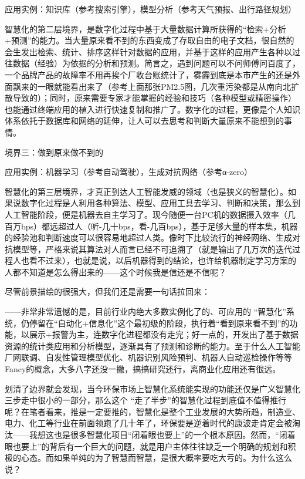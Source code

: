 \documentclass[
]{book}
\begin{document}
应用实例：知识库（参考搜索引擎），模型分析（参考天气预报、出行路径规划）

智慧化的第二层境界，是数字化过程中基于大量数据计算所获得的``检索+分析+预测''的能力。当大量原来看不到的东西变成了存取自由的电子文档，很自然的会生发出检索、统计、排序这样针对数据的应用，并基于这样的应用产生各种以过往数据（经验）为依据的分析和预测。简言之，遇到问题可以不问师傅问百度了，一个品牌产品的故障率不用再挨个厂收台账统计了，雾霾到底是本市产生的还是外面飘来的一眼就能看出来了（参考上面那张PM2.5图，几次重污染都是从南向北扩散导致的）；同时，原来需要专家才能掌握的经验和技巧（各种模型或精密操作）也能通过终端应用的植入进行快速复制和推广了。数字化的过程，更像是个人知识体系依托于数据库和网络的延伸，让人可以去思考和判断大量原来不能想到的事情。

境界三：做到原来做不到的

应用实例：机器学习（参考自动驾驶），生成对抗网络（参考α-zero）

智慧化的第三层境界，才真正到达人工智能发威的领域（也是狭义的智慧化）。如果说数字化过程是人利用各种算法、模型、应用工具去学习、判断和决策，那么到人工智能阶段，便是机器去自主学习了。现今随便一台PC机的数据摄入效率（几百万bps）都远超过人（听-几十bps，看-几百bps），基于足够大量的样本集，机器的经验池和判断速度可以很容易地超过人类。像时下比较流行的神经网络、生成对抗模型等，严格来说其算法对人而言已经不可追溯了（就是输出了几万次的迭代过程人也看不过来），也就是说，以后机器得到的结论，也许给机器制定学习方案的人都不知道是怎么得出来的------这个时候我是信还是不信呢？

尽管前景描绘的很强大，但我们还是需要一句话拉回来：

------非常非常遗憾的是，目前行业内绝大多数实例化了的、可应用的 ``智慧化''系统，仍停留在``自动化+信息化''这个最初级的阶段，执行着``看到原来看不到''的功能，以展示+报警为主，连数字化进程都没有走完；好一点的，开发出了基于数据资源的统计类应用和分析模型，逐渐具有了预测和诊断的能力。至于什么人工智能厂网联调、自发性管理模型优化、机器识别风险预判、机器人自动巡检操作等等Fancy的概念，大多八字还没一撇，搞搞研究还行，离商业化应用还有很远。

划清了边界就会发现，当今环保市场上智慧化系统能实现的功能还仅是广义智慧化三步走中很小的一部分，那么这个 ``走了半步''的智慧化过程到底值不值得推行呢？在笔者看来，推是一定要推的，智慧化是整个工业发展的大势所趋，制造业、电力、化工等行业在前面领跑了几十年了，环保要是逆着时代的康波走肯定会被淘汰------我想这也是很多智慧化项目``闭着眼也要上''的一个根本原因。然而，``闭着眼也要上''的背后有一个巨大的问题，就是用户主体往往缺乏一个明确的规划和积极的心态。而如果单纯的为了智慧而智慧，是很大概率要吃大亏的。为什么这么说？
\end{document}
